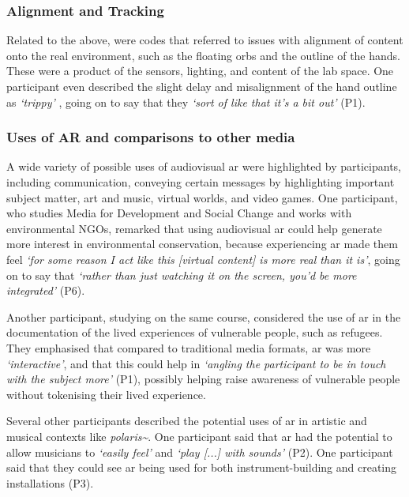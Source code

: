 \subsubsection{Alignment and Tracking}\label{sec: polaris-feedback-adoption-alignment}
Related to the above, were codes that referred to issues with alignment of content onto the real environment, such as the floating orbs and the outline of the hands. These were a product of the sensors, lighting, and content of the lab space. One participant even described the slight delay and misalignment of the hand outline as \textit{`trippy'} , going on to say that they \textit{`sort of like that it's a bit out'} (P1).

\subsubsection{Uses of AR and comparisons to other media}\label{sec: polaris-feedback-adoption-uses}
A wide variety of possible uses of audiovisual \gls{ar} were highlighted by participants, including communication, conveying certain messages by highlighting important subject matter, art and music, virtual worlds, and video games.
One participant, who studies Media for Development and Social Change and works with environmental NGOs, remarked that using audiovisual \gls{ar} could help generate more interest in environmental conservation, because experiencing \gls{ar} made them feel \textit{`for some reason I act like this [virtual content] is more real than it is'}, going on to say that \textit{`rather than just watching it on the screen, you'd be more integrated'} (P6).

Another participant, studying on the same course, considered the use of \gls{ar} in the documentation of the lived experiences of vulnerable people, such as refugees. They emphasised that compared to traditional media formats, \gls{ar} was more \textit{`interactive'}, and that this could help in \textit{`angling the participant to be in touch with the subject more'} (P1), possibly helping raise awareness of vulnerable people without tokenising their lived experience.

Several other participants described the potential uses of \gls{ar} in artistic and musical contexts like \textit{polaris\textasciitilde{}}. One participant said that \gls{ar} had the potential to allow musicians to \textit{`easily feel'} and \textit{`play [...] with sounds'} (P2). One participant said that they could see \gls{ar} being used for both instrument-building and creating installations (P3).

